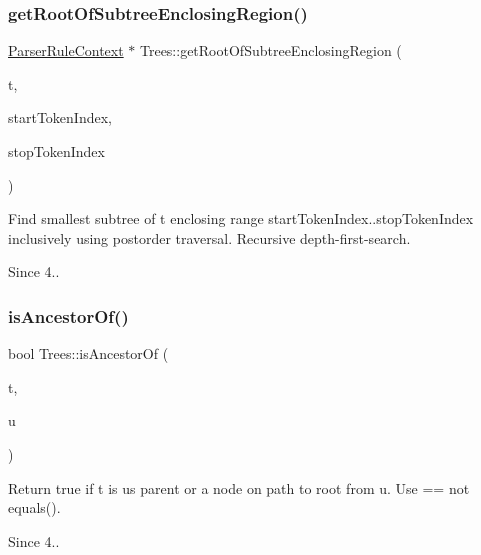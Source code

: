 \subsubsection{\texorpdfstring{get\+Root\+Of\+Subtree\+Enclosing\+Region()}{getRootOfSubtreeEnclosingRegion()}}
{\footnotesize\ttfamily \hyperlink{classantlr4_1_1ParserRuleContext}{Parser\+Rule\+Context} $\ast$ Trees\+::get\+Root\+Of\+Subtree\+Enclosing\+Region (\begin{DoxyParamCaption}\item[{\hyperlink{classantlr4_1_1tree_1_1ParseTree}{Parse\+Tree} $\ast$}]{t,  }\item[{size\+\_\+t}]{start\+Token\+Index,  }\item[{size\+\_\+t}]{stop\+Token\+Index }\end{DoxyParamCaption})\hspace{0.3cm}{\ttfamily [static]}}

Find smallest subtree of t enclosing range start\+Token\+Index..stop\+Token\+Index inclusively using postorder traversal. Recursive depth-\/first-\/search.

\begin{DoxySince}{Since}
4.. 
\end{DoxySince}
\mbox{\label{classantlr4_1_1tree_1_1Trees_a85f8d8b2badb30b1153b20f6f9c4c62b}} 
\subsubsection{\texorpdfstring{is\+Ancestor\+Of()}{isAncestorOf()}}
{\footnotesize\ttfamily bool Trees\+::is\+Ancestor\+Of (\begin{DoxyParamCaption}\item[{\hyperlink{classantlr4_1_1tree_1_1ParseTree}{Parse\+Tree} $\ast$}]{t,  }\item[{\hyperlink{classantlr4_1_1tree_1_1ParseTree}{Parse\+Tree} $\ast$}]{u }\end{DoxyParamCaption})\hspace{0.3cm}{\ttfamily [static]}}

Return true if t is u\textquotesingle{}s parent or a node on path to root from u. Use == not equals().

\begin{DoxySince}{Since}
4.. 
\end{DoxySince}
\mbox{\label{classantlr4_1_1tree_1_1Trees_af42d30a3549e9eb77ee0cda86f108a99}} 
